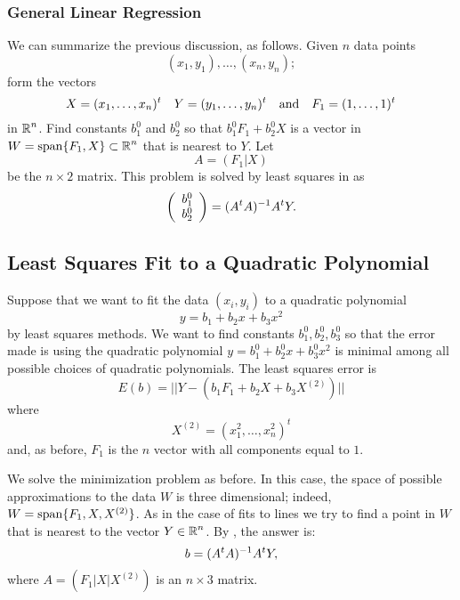 \documentclass{ximera}
\begin{document}
\subsubsection*{General Linear Regression}

We can summarize the previous discussion, as follows.  Given $n$ data points
\[
(x_1,y_1),\ldots, (x_n,y_n);
\]
form the vectors
\[
X=(x_1,\ldots,x_n)^t \quad Y=(y_1,\ldots,y_n)^t \quad\mbox{and}\quad F_1=(1,\ldots,1)^t
\]
in $\mbox{$\Bbb{R}$}^n$.  Find constants $b_1^0$ and $b_2^0$ so that $b_1^0F_1+b_2^0X$ is
a vector in $W={\rm span}\{F_1,X\}\subset\mbox{$\Bbb{R}$}^n$ that is nearest to $Y$.  Let
\[
A=(F_1|X)
\]
be the $n\times 2$ matrix.  This problem is solved by least squares in
 as
\begin{equation}  \label{E:LSlinfit}
\left(\begin{array}{r} b_1^0 \\ b_2^0\end{array}\right) = (A^tA)^{-1} A^tY.
\end{equation}


\subsection*{Least Squares Fit to a Quadratic Polynomial}

Suppose that we want to fit the data $(x_i,y_i)$ to a quadratic polynomial
\[
y=b_1+b_2x+b_3x^2
\]
by least squares methods.  We want to find constants $b_1^0,b_2^0,b_3^0$ so
that the error made is using the quadratic polynomial $y=b_1^0+b_2^0x+b_3^0x^2$
is minimal among all possible choices of quadratic polynomials.  The least
squares error is
\[
E(b) = ||Y-\left(b_1F_1+b_2X+b_3X^{(2)}\right)||
\]
where
\[
X^{(2)}=\left(x_1^2,\ldots,x_n^2\right)^t
\]
and, as before, $F_1$ is the $n$ vector with all components equal to $1$.

We solve the minimization problem as before.  In this case, the space of
possible approximations to the data $W$ is three dimensional; indeed,
$W={\rm span}\{F_1,X,X^{(2)}\}$.  As in the case of fits to lines we try to
find a point in $W$ that is nearest to the vector $Y\in\mbox{$\Bbb{R}$}^n$.  By
, the answer is:
\[
b = (A^tA)^{-1} A^tY,
\]
where $A=(F_1|X|X^{(2)})$ is an $n\times 3$ matrix.
\end{document}
